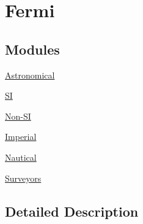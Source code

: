 \hypertarget{group___e_g_x_math-_conversions-_length_conversions-_non-_s_i-_fermi}{}\section{Fermi}
\label{group___e_g_x_math-_conversions-_length_conversions-_non-_s_i-_fermi}
\subsection*{Modules}
\begin{DoxyCompactItemize}
\item 
\mbox{\hyperlink{group___e_g_x_math-_conversions-_length_conversions-_non-_s_i-_fermi-_astronomical}{Astronomical}}
\item 
\mbox{\hyperlink{group___e_g_x_math-_conversions-_length_conversions-_non-_s_i-_fermi-_s_i}{SI}}
\item 
\mbox{\hyperlink{group___e_g_x_math-_conversions-_length_conversions-_non-_s_i-_fermi-_non-_s_i}{Non-\/\+SI}}
\item 
\mbox{\hyperlink{group___e_g_x_math-_conversions-_length_conversions-_non-_s_i-_fermi-_imperial}{Imperial}}
\item 
\mbox{\hyperlink{group___e_g_x_math-_conversions-_length_conversions-_non-_s_i-_fermi-_nautical}{Nautical}}
\item 
\mbox{\hyperlink{group___e_g_x_math-_conversions-_length_conversions-_non-_s_i-_fermi-_surveyors}{Surveyors}}
\end{DoxyCompactItemize}


\subsection{Detailed Description}
